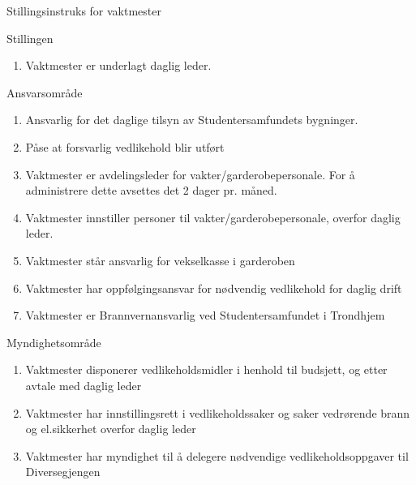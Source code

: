 \documentclass[fsbok.tex]{subfiles}
\begin{document}
\begin{instruks*}{Stillingsinstruks for vaktmester}
    \begin{instruksledd}{Stillingen}
        \begin{enumerate}
            \item Vaktmester er underlagt daglig leder.
        \end{enumerate}    
    \end{instruksledd}

    \begin{instruksledd}{Ansvarsområde}
        \begin{enumerate}
            \item Ansvarlig for det daglige tilsyn av Studentersamfundets bygninger.
            \item Påse at forsvarlig vedlikehold blir utført
            \item Vaktmester er avdelingsleder for vakter/garderobepersonale. For å administrere dette avsettes det 2 dager pr.
                måned.
            \item Vaktmester innstiller personer til vakter/garderobepersonale, overfor daglig leder.
            \item Vaktmester står ansvarlig for vekselkasse i garderoben
            \item Vaktmester har oppfølgingsansvar for nødvendig vedlikehold for daglig drift
            \item Vaktmester er Brannvernansvarlig ved Studentersamfundet i Trondhjem
        \end{enumerate}    
    \end{instruksledd}

    \begin{instruksledd}{Myndighetsområde}
        \begin{enumerate}
            \item Vaktmester disponerer vedlikeholdsmidler i henhold til budsjett, og etter avtale med daglig leder
            \item Vaktmester har innstillingsrett i vedlikeholdssaker og saker vedrørende brann og el.sikkerhet overfor daglig
                leder
            \item Vaktmester har myndighet til å delegere nødvendige vedlikeholdsoppgaver til Diversegjengen
        \end{enumerate}
    \end{instruksledd}


\end{instruks*}
\end{document}
